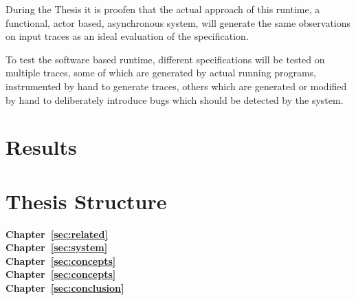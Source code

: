 During the Thesis it is proofen that the actual approach of this runtime, a functional, actor based, asynchronous system,
will generate the same observations on input traces as an ideal evaluation of the specification.

To test the software based runtime, different specifications will be tested on multiple traces, some of which are generated by actual running programs,
instrumented by hand to generate traces, others which are generated or modified by hand to deliberately introduce bugs which should be detected by the system.

\section{Results}
\label{sec:intro:results}


\section{Thesis Structure}
\label{sec:intro:structure}

\textbf{Chapter~\ref{sec:related}} \\[0.2em]

\textbf{Chapter~\ref{sec:system}} \\[0.2em]

\textbf{Chapter~\ref{sec:concepts}} \\[0.2em]

\textbf{Chapter~\ref{sec:concepts}} \\[0.2em]

\textbf{Chapter~\ref{sec:conclusion}} \\[0.2em]
